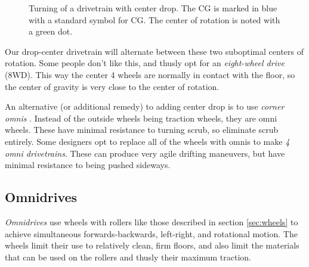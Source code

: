 \begin{figure}[H]
\begin{subfigure}[]{0.5\linewidth}
\end{subfigure}
\caption{Turning of a drivetrain with center drop. The CG is marked in blue with a standard symbol for CG. The center of rotation is noted with a green dot.}
\end{figure}

Our drop-center drivetrain will alternate between these two suboptimal centers of rotation. Some people don't like this, and thusly opt for an \textit{eight-wheel drive} (8WD). This way the center 4 wheels are normally in contact with the floor, so the center of gravity is very close to the center of rotation.

An alternative (or additional remedy) to adding center drop is to use \textit{corner omnis} . Instead of the outside wheels being traction wheels, they are omni wheels. These have minimal resistance to turning scrub, so eliminate scrub entirely. Some designers opt to replace all of the wheels with omnis to make \textit{4 omni drivetrains}. These can produce very agile drifting maneuvers, but have minimal resistance to being pushed sideways.

\subsection{Omnidrives}
\textit{Omnidrives} use wheels with rollers like those described in section \ref{sec:wheels} to achieve simultaneous forwards-backwards, left-right, and rotational motion. The wheels limit their use to relatively clean, firm floors, and also limit the materials that can be used on the rollers and thusly their maximum traction.

